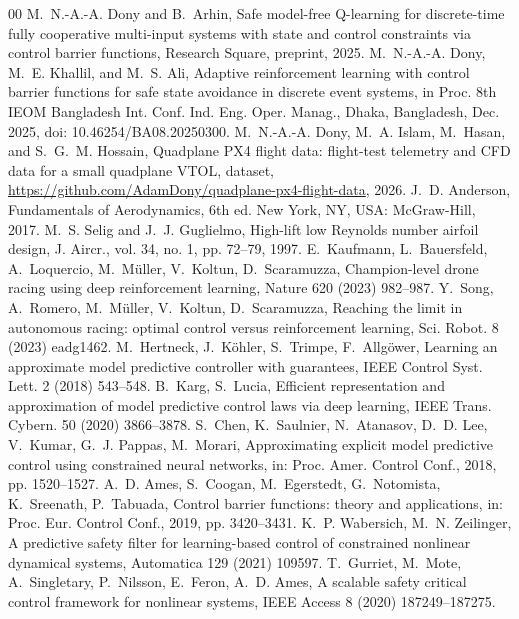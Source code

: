 \begin{thebibliography}{00}
 M.~N.-A.-A. Dony and B.~Arhin, Safe model-free Q-learning for discrete-time fully cooperative multi-input systems with state and control constraints via control barrier functions, Research Square, preprint, 2025.
 M.~N.-A.-A. Dony, M.~E. Khallil, and M.~S. Ali, Adaptive reinforcement learning with control barrier functions for safe state avoidance in discrete event systems, in Proc. 8th IEOM Bangladesh Int. Conf. Ind. Eng. Oper. Manag., Dhaka, Bangladesh, Dec. 2025, doi: 10.46254/BA08.20250300.
 M.~N.-A.-A. Dony, M.~A. Islam, M.~Hasan, and S.~G.~M. Hossain, Quadplane PX4 flight data: flight-test telemetry and CFD data for a small quadplane VTOL, dataset, \url{https://github.com/AdamDony/quadplane-px4-flight-data}, 2026.
 J.~D. Anderson, Fundamentals of Aerodynamics, 6th ed. New York, NY, USA: McGraw-Hill, 2017.
 M.~S. Selig and J.~J. Guglielmo, High-lift low Reynolds number airfoil design, J. Aircr., vol. 34, no. 1, pp. 72--79, 1997.
 E.~Kaufmann, L.~Bauersfeld, A.~Loquercio, M.~M\"uller, V.~Koltun, D.~Scaramuzza, Champion-level drone racing using deep reinforcement learning, Nature 620 (2023) 982--987.
 Y.~Song, A.~Romero, M.~M\"uller, V.~Koltun, D.~Scaramuzza, Reaching the limit in autonomous racing: optimal control versus reinforcement learning, Sci. Robot. 8 (2023) eadg1462.
 M.~Hertneck, J.~K\"ohler, S.~Trimpe, F.~Allg\"ower, Learning an approximate model predictive controller with guarantees, IEEE Control Syst. Lett. 2 (2018) 543--548.
 B.~Karg, S.~Lucia, Efficient representation and approximation of model predictive control laws via deep learning, IEEE Trans. Cybern. 50 (2020) 3866--3878.
 S.~Chen, K.~Saulnier, N.~Atanasov, D.~D. Lee, V.~Kumar, G.~J. Pappas, M.~Morari, Approximating explicit model predictive control using constrained neural networks, in: Proc. Amer. Control Conf., 2018, pp. 1520--1527.
 A.~D. Ames, S.~Coogan, M.~Egerstedt, G.~Notomista, K.~Sreenath, P.~Tabuada, Control barrier functions: theory and applications, in: Proc. Eur. Control Conf., 2019, pp. 3420--3431.
 K.~P. Wabersich, M.~N. Zeilinger, A predictive safety filter for learning-based control of constrained nonlinear dynamical systems, Automatica 129 (2021) 109597.
 T.~Gurriet, M.~Mote, A.~Singletary, P.~Nilsson, E.~Feron, A.~D. Ames, A scalable safety critical control framework for nonlinear systems, IEEE Access 8 (2020) 187249--187275.

\end{thebibliography}
